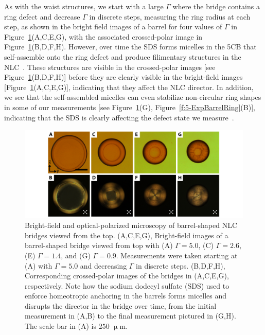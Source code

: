 As with the waist structures, we start with a large $\Gamma$ where the bridge contains a ring defect and decrease $\Gamma$ in discrete steps, measuring the ring radius at each step, as shown in the bright field images of a barrel for four values of $\Gamma$ in Figure~\ref{f:5-ExpBarrelTop}(A,C,E,G), with the associated crossed-polar image in Figure~\ref{f:5-ExpBarrelTop}(B,D,F,H).
However, over time the SDS forms micelles in the 5CB that self-assemble onto the ring defect and produce filimentary structures in the NLC~\cite{RN279}.
These structures are visible in the crossed-polar images [see Figure~\ref{f:5-ExpBarrelTop}(B,D,F,H)] before they are clearly visible in the bright-field images [Figure~\ref{f:5-ExpBarrelTop}(A,C,E,G)], indicating that they affect the NLC director.
In addition, we see that the self-assembled micelles can even stabilize non-circular ring shapes in some of our measurements [see Figure~\ref{f:5-ExpBarrelTop}(G), Figure~\ref{f:5-ExpBarrelRing}(B)], indicating that the SDS is clearly affecting the defect state we measure~\cite{RN279,RN280}.
\begin{figure}
  \centering
  \includegraphics{figures/C5/Ch5-Figs_ExpBarrelTop.png}
  \caption{Bright-field and optical-polarized microscopy of barrel-shaped NLC bridges viewed from the top.
  (A,C,E,G), Bright-field images of a barrel-shaped bridge viewed from top with (A) $\Gamma = 5.0$, (C) $\Gamma = 2.6$, (E) $\Gamma = 1.4$, and (G) $\Gamma = 0.9$.
  Measurements were taken starting at (A) with $\Gamma = 5.0$ and decreasing $\Gamma$ in discrete steps.
  (B,D,F,H), Corresponding crossed-polar images of the bridges in (A,C,E,G), respectively.
  Note how the sodium dodecyl sulfate (SDS) used to enforce homeotropic anchoring in the barrels forms micelles and disrupts the director in the bridge over time, from the initial measurement in (A,B) to the final measurement pictured in (G,H).
  The scale bar in (A) is $250$ $\upmu$m.}\label{f:5-ExpBarrelTop}
\end{figure}

